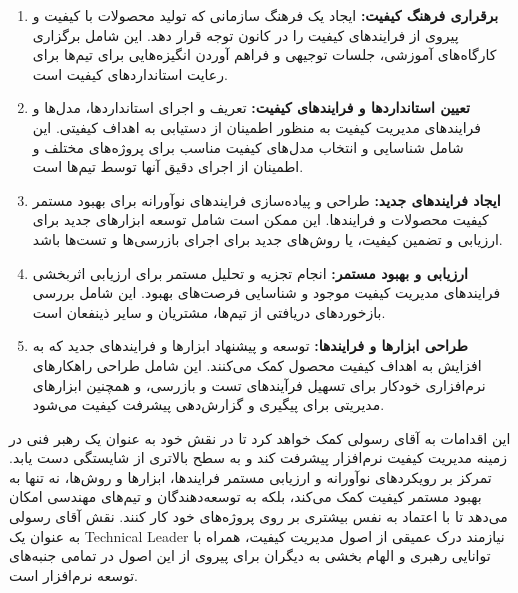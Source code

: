 \begin{enumerate}
	\item \textbf{برقراری فرهنگ کیفیت:} ایجاد یک فرهنگ سازمانی که تولید محصولات با کیفیت و پیروی از فرایندهای کیفیت را در کانون توجه قرار دهد. این شامل برگزاری کارگاه‌های آموزشی، جلسات توجیهی و فراهم آوردن انگیزه‌هایی برای تیم‌ها برای رعایت استانداردهای کیفیت است.
	\item \textbf{تعیین استانداردها و فرایندهای کیفیت:} تعریف و اجرای استانداردها، مدل‌ها و فرایندهای مدیریت کیفیت به منظور اطمینان از دستیابی به اهداف کیفیتی. این شامل شناسایی و انتخاب مدل‌های کیفیت مناسب برای پروژه‌های مختلف و اطمینان از اجرای دقیق آنها توسط تیم‌ها است.
	\item \textbf{ایجاد فرایندهای جدید:} طراحی و پیاده‌سازی فرایندهای نوآورانه برای بهبود مستمر کیفیت محصولات و فرایندها. این ممکن است شامل توسعه ابزارهای جدید برای ارزیابی و تضمین کیفیت، یا روش‌های جدید برای اجرای بازرسی‌ها و تست‌ها باشد.
	\item \textbf{ارزیابی و بهبود مستمر:} انجام تجزیه و تحلیل مستمر برای ارزیابی اثربخشی فرایندهای مدیریت کیفیت موجود و شناسایی فرصت‌های بهبود. این شامل بررسی بازخوردهای دریافتی از تیم‌ها، مشتریان و سایر ذینفعان است.
	\item \textbf{طراحی ابزارها و فرایندها:} توسعه و پیشنهاد ابزارها و فرایندهای جدید که به افزایش به اهداف کیفیت محصول کمک می‌کنند. این شامل طراحی راهکارهای نرم‌افزاری خودکار برای تسهیل فرآیندهای تست و بازرسی، و همچنین ابزارهای مدیریتی برای پیگیری و گزارش‌دهی پیشرفت کیفیت می‌شود.
\end{enumerate}

این اقدامات به آقای رسولی کمک خواهد کرد تا در نقش خود به عنوان یک رهبر فنی در زمینه مدیریت کیفیت نرم‌افزار پیشرفت کند و به سطح بالاتری از شایستگی دست یابد. تمرکز بر رویکردهای نوآورانه و ارزیابی مستمر فرایندها، ابزارها و روش‌ها، نه تنها به بهبود مستمر کیفیت کمک می‌کند، بلکه به توسعه‌دهندگان و تیم‌های مهندسی امکان می‌دهد تا با اعتماد به نفس بیشتری بر روی پروژه‌های خود کار کنند. نقش آقای رسولی به عنوان یک Technical Leader نیازمند درک عمیقی از اصول مدیریت کیفیت، همراه با توانایی رهبری و الهام بخشی به دیگران برای پیروی از این اصول در تمامی جنبه‌های توسعه نرم‌افزار است.